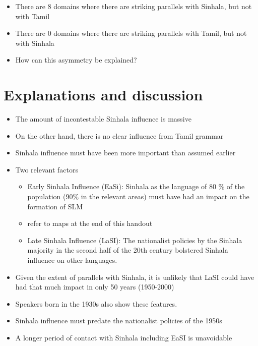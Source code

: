 \documentclass[a4paper,12pt]{article}
\begin{document}
\begin{itemize}
 \item There are 8 domains where there are striking parallels with Sinhala, but not with Tamil
\item There are 0 domains where there are striking parallels with Tamil, but not with Sinhala
\item How  can this asymmetry be explained?
\end{itemize}

\section{Explanations and discussion}

\begin{itemize}
\item The amount of incontestable Sinhala influence is massive
\item On the other hand, there is no clear influence from Tamil grammar
\item Sinhala influence must have been more important than assumed earlier
\item Two relevant factors
\begin{itemize}
 \item Early Sinhala Influence (EaSi): Sinhala as the language of 80 \% of the population (90\% in the relevant areas) must have had an impact on the formation of SLM \citep[cf.][]{Ansaldo2008genesis}
 \item refer to maps at the end of this handout
 \item Late Sinhala Influence (LaSI): The nationalist policies by the Sinhala majority in the second half of the 20th century bolstered Sinhala influence on other languages.
\end{itemize}
\item Given the extent of parallels with Sinhala, it is unlikely that LaSI could have had that much impact in only 50 years (1950-2000)
\item Speakers born in the 1930s also show these features.
\item Sinhala influence must predate the nationalist policies of the 1950s 
\item A longer period of contact with Sinhala including EaSI is unavoidable
\end{itemize}
%
\end{document}
